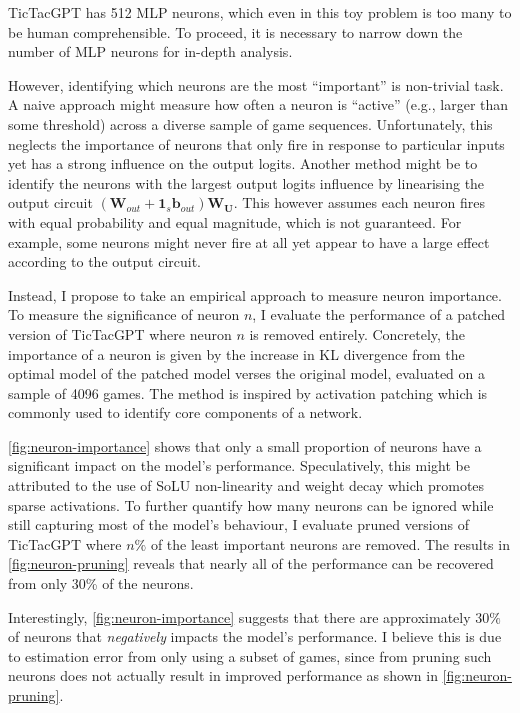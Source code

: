 \documentclass{article}
\newcommand{\ttgpt}{TicTacGPT\xspace}
\renewcommand{\v}[1]{\mathbf{\bm{#1}}}
\newcommand{\m}[1]{\mathbf{\bm{#1}}}
\newcounter{num}
\begin{document}
\ttgpt has 512 MLP neurons, which even in this toy problem is too many to be human comprehensible. To proceed, it is necessary to narrow down the number of MLP neurons for in-depth analysis.

However, identifying which neurons are the most ``important'' is non-trivial task. A naive approach might measure how often a neuron is ``active'' (e.g., larger than some threshold) across a diverse sample of game sequences. Unfortunately, this neglects the importance of neurons that only fire in response to particular inputs yet has a strong influence on the output logits. Another method might be to identify the neurons with the largest output logits influence by linearising the output circuit $(\m{W}_{out} + \v{1}_s \v{b}_{out}) \m{W_U}$. This however assumes each neuron fires with equal probability and equal magnitude, which is not guaranteed. For example, some neurons might never fire at all yet appear to have a large effect according to the output circuit.

Instead, I propose to take an empirical approach to measure neuron importance. To measure the significance of neuron $n$, I evaluate the performance of a patched version of \ttgpt where neuron $n$ is removed entirely. Concretely, the importance of a neuron is given by the increase in KL divergence from the optimal model of the patched model verses the original model, evaluated on a sample of 4096 games. The method is inspired by activation patching \citep{meng2022locating,vig2020investigating} which is commonly used to identify core components of a network.

\cref{fig:neuron-importance} shows that only a small proportion of neurons have a significant impact on the model's performance. Speculatively, this might be attributed to the use of SoLU non-linearity and weight decay which promotes sparse activations. To further quantify how many neurons can be ignored while still capturing most of the model's behaviour, I evaluate pruned versions of \ttgpt where $n\%$ of the least important neurons are removed. The results in \cref{fig:neuron-pruning} reveals that nearly all of the performance can be recovered from only 30\% of the neurons.

Interestingly, \cref{fig:neuron-importance} suggests that there are
approximately $30\%$ of neurons that \emph{negatively} impacts the model's performance. I believe this is due to estimation error from only using a subset of games, since from pruning such neurons does not actually result in improved performance as shown in \cref{fig:neuron-pruning}.
\end{document}
